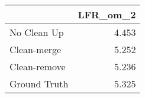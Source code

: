 \begin{tabular}{lr}
\toprule
{} & LFR_om_2 \\
\midrule
No Clean Up  &    4.453 \\
Clean-merge  &    5.252 \\
Clean-remove &    5.236 \\
Ground Truth &    5.325 \\
\bottomrule
\end{tabular}
